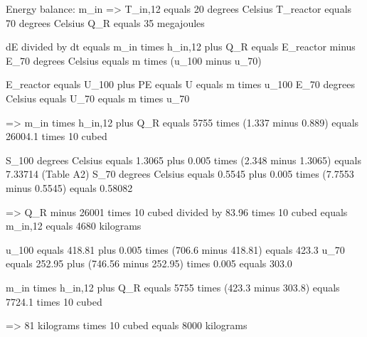 Energy balance:  
m_in => T_in,12 equals 20 degrees Celsius  
T_reactor equals 70 degrees Celsius  
Q_R equals 35 megajoules  

dE divided by dt equals m_in times h_in,12 plus Q_R equals E_reactor minus E_70 degrees Celsius equals m times (u_100 minus u_70)  

E_reactor equals U_100 plus PE equals U equals m times u_100  
E_70 degrees Celsius equals U_70 equals m times u_70  

=> m_in times h_in,12 plus Q_R equals 5755 times (1.337 minus 0.889) equals 26004.1 times 10 cubed  

S_100 degrees Celsius equals 1.3065 plus 0.005 times (2.348 minus 1.3065) equals 7.33714 (Table A2)  
S_70 degrees Celsius equals 0.5545 plus 0.005 times (7.7553 minus 0.5545) equals 0.58082  

=> Q_R minus 26001 times 10 cubed divided by 83.96 times 10 cubed equals m_in,12 equals 4680 kilograms  

u_100 equals 418.81 plus 0.005 times (706.6 minus 418.81) equals 423.3  
u_70 equals 252.95 plus (746.56 minus 252.95) times 0.005 equals 303.0  

m_in times h_in,12 plus Q_R equals 5755 times (423.3 minus 303.8) equals 7724.1 times 10 cubed  

=> 81 kilograms times 10 cubed equals 8000 kilograms